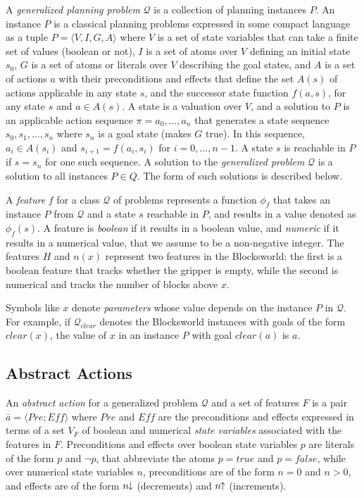 \documentclass[letterpaper]{article} %
\newcommand{\tup}[1]{\langle #1 \rangle}
\newcommand{\Q}{\mathcal{Q}}
\newcommand{\Eff}{{\mathit{Eff}}}
\newcommand{\abst}[2]{\tup{#1;#2}}
\newcommand{\pplus}{\hspace{-.05em}\raisebox{.15ex}{\footnotesize$\uparrow$}}
\newcommand{\mminus}{\hspace{-.05em}\raisebox{.15ex}{\footnotesize$\downarrow$}}
\begin{document}
A \emph{generalized planning problem} $\Q$ is a collection of planning instances $P$.
An instance $P$ is a  classical planning problems expressed in some compact language
as a tuple $P=\tup{V,I,G,A}$ where $V$ is a set of state variables that can take a
finite set of values (boolean or not), $I$ is a set of atoms over $V$ defining an
initial state $s_0$, $G$ is a set of atoms or literals over $V$ describing the goal
states, and $A$ is a set of actions $a$ with their preconditions and effects that
define the set $A(s)$ of actions applicable in any state $s$, and the successor
state function $f(a,s)$, for any state $s$ and $a \in A(s)$.
A state is a valuation over $V$, and a solution to $P$ is an applicable action
sequence $\pi=a_0,\ldots,a_n$ that generates  a state sequence $s_0,s_1,\ldots,s_{n}$
where $s_n$ is a goal state (makes $G$ true). In this sequence, $a_i \in A(s_i)$
and $s_{i+1}=f(a_i,s_i)$ for $i=0, \ldots, n-1$. A state $s$ is reachable in $P$
if $s=s_n$ for one such sequence. A solution to the \emph{generalized problem}
$\Q$ is a solution to all instances $P \in Q$. The form of such solutions is
described below.

A \emph{feature} $f$ for a class $\Q$ of problems represents a function $\phi_f$
that takes an instance $P$ from $\Q$ and a state $s$ reachable in $P$, and results
in a value denoted as $\phi_f(s)$. 
A feature is \emph{boolean} if it results in a boolean value, and \emph{numeric}
if it results in a numerical value, that we assume to be a non-negative integer.
The features $H$ and $n(x)$ represent two features in the Blocksworld:
the first is a boolean feature that tracks whether the gripper is empty, while
the second is numerical and tracks the number of blocks above $x$. 

Symbols like $x$ denote \emph{parameters} whose value depends on the
instance $P$ in $\Q$. For example, if $\Q_{clear}$ denotes the Blocksworld
instances with goals of the form $clear(x)$, the value of $x$ in an instance
$P$ with goal $clear(a)$ is $a$.


\subsection{Abstract Actions}

An \emph{abstract action}  for a generalized problem $\Q$ and a set of features $F$
is a pair $\bar{a}=\abst{Pre}{\Eff}$ where $Pre$ and $\Eff$ are the  preconditions
and effects expressed in terms of a  set $V_F$ of boolean and numerical \emph{state variables}
associated with the features in $F$. Preconditions and effects over boolean state variables $p$ are literals of the form $p$
and $\neg p$, that abbreviate the  atoms $p=true$ and $p=false$, while  over  numerical state variables $n$,
preconditions are of  the form $n=0$ and $n > 0$, and effects are  of the form $n\mminus$ (decrements) and
$n\pplus$ (increments).
\end{document}
